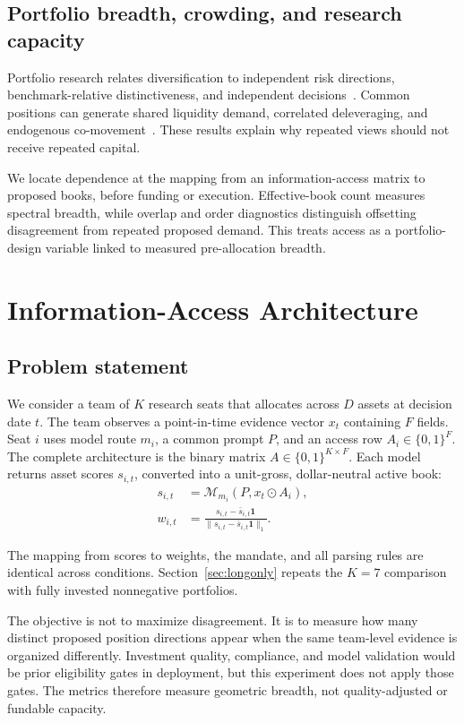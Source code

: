 \documentclass[sigconf]{acmart}
\begin{document}
\subsection{Portfolio breadth, crowding, and research capacity}
Portfolio research relates diversification to independent risk directions, benchmark-relative distinctiveness, and independent decisions~\cite{meucci2009enb,cremers2009activeshare,grinold2000active}. Common positions can generate shared liquidity demand, correlated deleveraging, and endogenous co-movement~\cite{khandani2011quants,bucci2020coimpact,lou2022comomentum}. These results explain why repeated views should not receive repeated capital.

We locate dependence at the mapping from an information-access matrix to proposed books, before funding or execution. Effective-book count measures spectral breadth, while overlap and order diagnostics distinguish offsetting disagreement from repeated proposed demand. This treats access as a portfolio-design variable linked to measured pre-allocation breadth.

\section{Information-Access Architecture}\label{sec:architecture}
\subsection{Problem statement}
We consider a team of $K$ research seats that allocates across $D$ assets at decision date $t$. The team observes a point-in-time evidence vector $x_t$ containing $F$ fields. Seat $i$ uses model route $m_i$, a common prompt $P$, and an access row $A_i\in\{0,1\}^{F}$. The complete architecture is the binary matrix $A\in\{0,1\}^{K\times F}$. Each model returns asset scores $s_{i,t}$, converted into a unit-gross, dollar-neutral active book:
\begin{align}
s_{i,t}&=\mathcal{M}_{m_i}(P,x_t\odot A_i),\\
w_{i,t}&=\frac{s_{i,t}-\bar{s}_{i,t}\mathbf{1}}
{\lVert s_{i,t}-\bar{s}_{i,t}\mathbf{1}\rVert_1}.\label{eq:bookmap}
\end{align}

The mapping from scores to weights, the mandate, and all parsing rules are identical across conditions. Section~\ref{sec:longonly} repeats the $K=7$ comparison with fully invested nonnegative portfolios.

The objective is not to maximize disagreement. It is to measure how many distinct proposed position directions appear when the same team-level evidence is organized differently. Investment quality, compliance, and model validation would be prior eligibility gates in deployment, but this experiment does not apply those gates. The metrics therefore measure geometric breadth, not quality-adjusted or fundable capacity.
\end{document}
